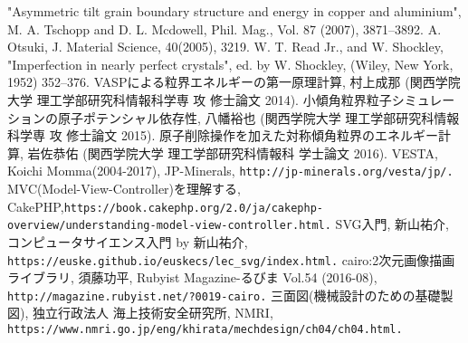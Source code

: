 \begin{thebibliography}{99}
   "Asymmetric tilt grain boundary structure and energy in copper and aluminium", M. A. Tschopp and D. L. Mcdowell, Phil. Mag., Vol. 87 (2007), 3871–3892.
   A. Otsuki, J. Material Science, 40(2005), 3219.
   W. T. Read Jr., and W. Shockley, "Imperfection in nearly perfect crystals", ed. by W. Shockley, (Wiley, New York, 1952) 352--376.
   VASPによる粒界エネルギーの第一原理計算, 村上成那 (関西学院大学 理工学部研究科情報科学専 攻 修士論文 2014).
   小傾角粒界粒子シミュレーションの原子ポテンシャル依存性, 八幡裕也 (関西学院大学 理工学部研究科情報科学専 攻 修士論文 2015).
   原子削除操作を加えた対称傾角粒界のエネルギー計算, 岩佐恭佑 (関西学院大学 理工学部研究科情報科 学士論文 2016).
   VESTA, Koichi Momma(2004-2017), JP-Minerals, \verb|http://jp-minerals.org/vesta/jp/.|
   MVC(Model-View-Controller)を理解する, CakePHP,\verb|https://book.cakephp.org/2.0/ja/cakephp-overview/understanding-model-view-controller.html.|
   SVG入門, 新山祐介, コンピュータサイエンス入門 by 新山祐介, \verb|https://euske.github.io/euskecs/lec_svg/index.html.|
   cairo:2次元画像描画ライブラリ, 須藤功平, Rubyist Magazine-るびま Vol.54 (2016-08), \verb|http://magazine.rubyist.net/?0019-cairo.|
   三面図(機械設計のための基礎製図), 独立行政法人 海上技術安全研究所, NMRI, \verb|https://www.nmri.go.jp/eng/khirata/mechdesign/ch04/ch04.html.|
\end{thebibliography}
